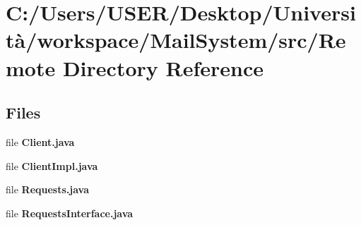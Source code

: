 \section{C\+:/\+Users/\+U\+S\+E\+R/\+Desktop/\+Università/workspace/\+Mail\+System/src/\+Remote Directory Reference}
\label{dir_0429bdeca331f59695ef47a3c3209b31}
\subsection*{Files}
\begin{DoxyCompactItemize}
\item 
file \textbf{ Client.\+java}
\item 
file \textbf{ Client\+Impl.\+java}
\item 
file \textbf{ Requests.\+java}
\item 
file \textbf{ Requests\+Interface.\+java}
\end{DoxyCompactItemize}
